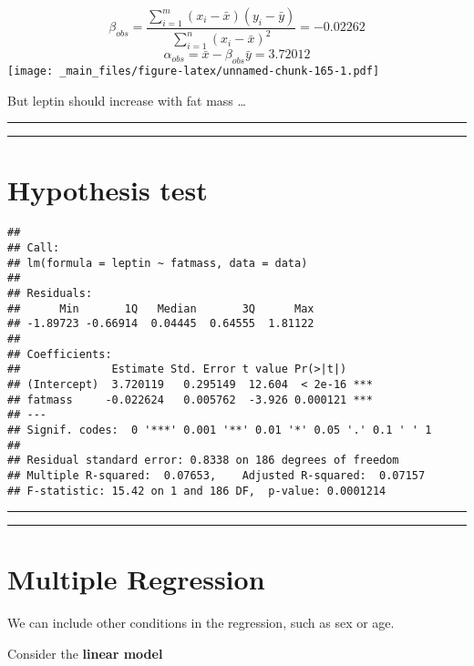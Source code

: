 \documentclass[
]{book}
\begin{document}
\[\beta_{obs}= \frac{\sum_{i=1}^m(x_i-\bar{x})(y_i-\bar{y})}{\sum_{i=1}^n(x_i-\bar{x})^2}= -0.02262\]
\[\alpha_{obs}=\bar{x}-\beta_{obs}\bar{y}= 3.72012\]
\texttt{[image: \_main\_files/figure-latex/unnamed-chunk-165-1.pdf]}

But leptin should increase with fat mass \ldots{}

\begin{center}\rule{0.5\linewidth}{0.5pt}\end{center}

\begin{center}\rule{0.5\linewidth}{0.5pt}\end{center}

\hypertarget{hypothesis-test}{%
\section{Hypothesis test}\label{hypothesis-test}}

\begin{verbatim}
## 
## Call:
## lm(formula = leptin ~ fatmass, data = data)
## 
## Residuals:
##      Min       1Q   Median       3Q      Max 
## -1.89723 -0.66914  0.04445  0.64555  1.81122 
## 
## Coefficients:
##              Estimate Std. Error t value Pr(>|t|)    
## (Intercept)  3.720119   0.295149  12.604  < 2e-16 ***
## fatmass     -0.022624   0.005762  -3.926 0.000121 ***
## ---
## Signif. codes:  0 '***' 0.001 '**' 0.01 '*' 0.05 '.' 0.1 ' ' 1
## 
## Residual standard error: 0.8338 on 186 degrees of freedom
## Multiple R-squared:  0.07653,    Adjusted R-squared:  0.07157 
## F-statistic: 15.42 on 1 and 186 DF,  p-value: 0.0001214
\end{verbatim}

\begin{center}\rule{0.5\linewidth}{0.5pt}\end{center}

\begin{center}\rule{0.5\linewidth}{0.5pt}\end{center}

\hypertarget{multiple-regression}{%
\section{Multiple Regression}\label{multiple-regression}}

We can include other conditions in the regression, such as sex or age.

Consider the \textbf{linear model}
\end{document}

